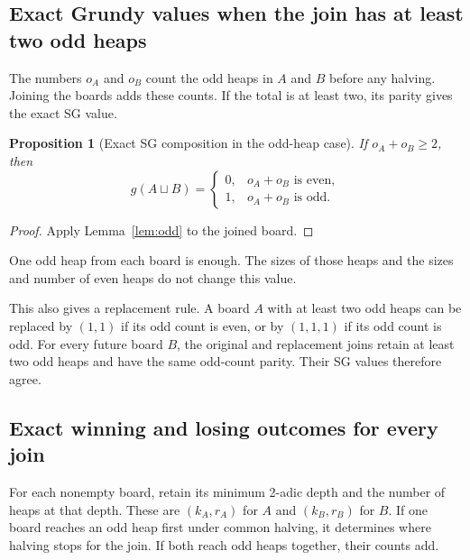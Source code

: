 \documentclass[10pt,a4paper]{article}
\newtheorem{proposition}[theorem]{Proposition}
\newcommand{\join}{\sqcup}
\begin{document}
\subsection{Exact Grundy values when the join has at least two odd heaps}

The numbers $o_A$ and $o_B$ count the odd heaps in $A$ and $B$
before any halving. Joining the boards adds these counts.
If the total is at least two, its parity gives the exact SG value.

\begin{proposition}[Exact SG composition in the odd-heap case]
\label{prop:oddjoin}
If $o_A+o_B\ge2$, then
\[
 \boxed{g(A\join B)=
 \begin{cases}
 0,&o_A+o_B\text{ is even},\\
 1,&o_A+o_B\text{ is odd}.
 \end{cases}}
\]
\end{proposition}
\begin{proof}
Apply Lemma~\ref{lem:odd} to the joined board.
\end{proof}

One odd heap from each board is enough. The sizes of those heaps and
the sizes and number of even heaps do not change this value.

This also gives a replacement rule. A board $A$ with at least two
odd heaps can be replaced by $(1,1)$ if its odd count is even, or by
$(1,1,1)$ if its odd count is odd. For every future board $B$, the
original and replacement joins retain at least two odd heaps and
have the same odd-count parity. Their SG values therefore agree.

\subsection{Exact winning and losing outcomes for every join}

For each nonempty board, retain its minimum 2-adic depth and
the number of heaps at that depth. These are $(k_A,r_A)$ for
$A$ and $(k_B,r_B)$ for $B$. If one board reaches an odd heap
first under common halving, it determines where halving stops
for the join. If both reach odd heaps together, their counts add.
\end{document}
